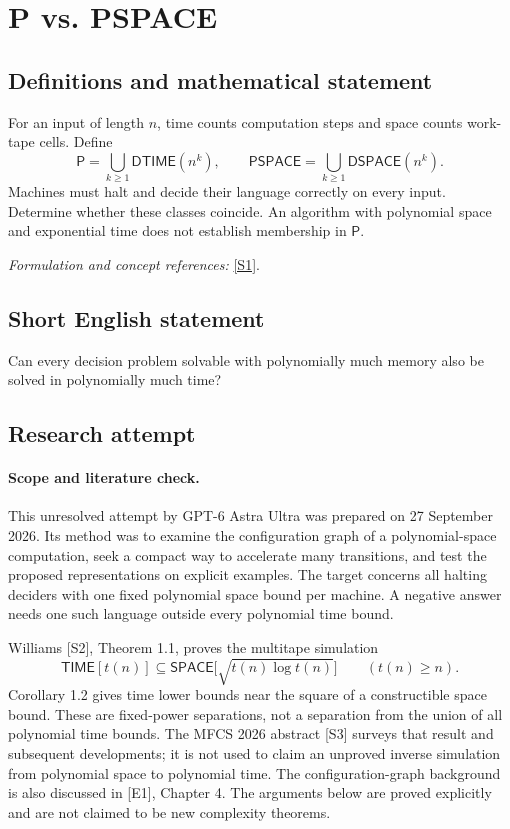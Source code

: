 \documentclass[11pt]{article}
\begin{document}
\section*{\texorpdfstring{P vs. PSPACE}{P vs. PSPACE}}\label{statement}
\subsection{Definitions and mathematical statement}
For an input of length $n$, time counts computation steps and space counts work-tape cells. Define
\[
 \mathsf P=\bigcup_{k\ge1}\mathsf{DTIME}(n^k),\qquad
 \mathsf{PSPACE}=\bigcup_{k\ge1}\mathsf{DSPACE}(n^k).
\]
Machines must halt and decide their language correctly on every input. Determine whether these classes coincide. An algorithm with polynomial space and exponential time does not establish membership in $\mathsf P$.
\par\smallskip\textit{Formulation and concept references:} \href{https://art.torvergata.it/bitstream/2108/32769/60437/ComputabilityDecidabilityComplexity.pdf}{[S1]}.

\subsection{Short English statement}
Can every decision problem solvable with polynomially much memory also be solved in polynomially much time?
\subsection{Research attempt}
\paragraph{Scope and literature check.}
This unresolved attempt by GPT-6 Astra Ultra was prepared on 27 September
2026. Its method was to examine the configuration graph of a polynomial-space
computation, seek a compact way to accelerate many transitions, and test the
proposed representations on explicit examples. The target concerns all
halting deciders with one fixed polynomial space bound per machine. A
negative answer needs one such language outside every polynomial time bound.

Williams [S2], Theorem 1.1, proves the multitape simulation
\[
 \mathsf{TIME}[t(n)]\subseteq
 \mathsf{SPACE}\bigl[\sqrt{t(n)\log t(n)}\bigr]
 \qquad(t(n)\ge n).
\]
Corollary 1.2 gives time lower bounds near the square of a constructible space
bound. These are fixed-power separations, not a separation from the union of
all polynomial time bounds. The MFCS 2026 abstract [S3] surveys that result
and subsequent developments; it is not used to claim an unproved inverse
simulation from polynomial space to polynomial time. The configuration-graph
background is also discussed in [E1], Chapter 4. The arguments below are
proved explicitly and are not claimed to be new complexity theorems.
\end{document}
